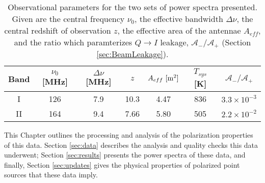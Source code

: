 \begin{table}\begin{center}
  \begin{tabular}{c c c c c c c}
    Band & $\nu_0$ [MHz] & $\Delta\nu$ [MHz] & $z$ & $A_{eff}\ [{\rm m}^2]$ & $T_{sys}$ [K] & $\mathcal{A}_-/\mathcal{A}_+$ \\
    \hline\hline
    I  & 126 & 7.9 & 10.3  & 4.47 & 836 & $3.3\times10^{-3}$ \\
    II & 164 & 9.4 &  7.66 & 5.80 & 505 & $2.2\times10^{-2}$
  \end{tabular}
  \caption[Observational parameters]{\label{tab:obsparams} Observational parameters for the two sets of power spectra
  presented. Given are the central frequency $\nu_0$, the effective bandwidth $\Delta\nu$, the
central redshift of observation $z$, the effective area of the antennae $A_{eff}$, and the ratio
which paramterizes $Q\to I$ leakage, $\mathcal{A}_-/\mathcal{A}_+$ (Section \ref{sec:BeamLeakage}).}
\end{center}\end{table}
This Chapter outlines the processing and analysis of the polarization properties of this
data. Section \ref{sec:data} describes the analysis and quality checks this data underwent; Section
\ref{sec:results} presents the power spectra of these data, and finally, Section \ref{sec:updates}
gives the physical properties of polarized point sources that these data imply.




